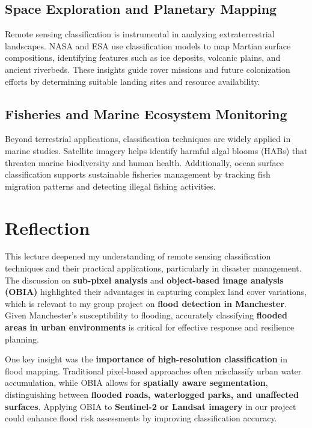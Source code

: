 \documentclass[
  letterpaper,
]{scrbook}
\begin{document}
\subsection{\texorpdfstring{\textbf{Space Exploration and Planetary
Mapping}}{Space Exploration and Planetary Mapping}}\label{space-exploration-and-planetary-mapping}

Remote sensing classification is instrumental in analyzing
extraterrestrial landscapes. NASA and ESA use classification models to
map Martian surface compositions, identifying features such as ice
deposits, volcanic plains, and ancient riverbeds. These insights guide
rover missions and future colonization efforts by determining suitable
landing sites and resource availability.

\subsection{\texorpdfstring{\textbf{Fisheries and Marine Ecosystem
Monitoring}}{Fisheries and Marine Ecosystem Monitoring}}\label{fisheries-and-marine-ecosystem-monitoring}

Beyond terrestrial applications, classification techniques are widely
applied in marine studies. Satellite imagery helps identify harmful
algal blooms (HABs) that threaten marine biodiversity and human health.
Additionally, ocean surface classification supports sustainable
fisheries management by tracking fish migration patterns and detecting
illegal fishing activities.

\section{Reflection}\label{reflection-5}

This lecture deepened my understanding of remote sensing classification
techniques and their practical applications, particularly in disaster
management. The discussion on \textbf{sub-pixel analysis} and
\textbf{object-based image analysis (OBIA)} highlighted their advantages
in capturing complex land cover variations, which is relevant to my
group project on \textbf{flood detection in Manchester}. Given
Manchester's susceptibility to flooding, accurately classifying
\textbf{flooded areas in urban environments} is critical for effective
response and resilience planning.

One key insight was the \textbf{importance of high-resolution
classification} in flood mapping. Traditional pixel-based approaches
often misclassify urban water accumulation, while OBIA allows for
\textbf{spatially aware segmentation}, distinguishing between
\textbf{flooded roads, waterlogged parks, and unaffected surfaces}.
Applying OBIA to \textbf{Sentinel-2 or Landsat imagery} in our project
could enhance flood risk assessments by improving classification
accuracy.
\end{document}
